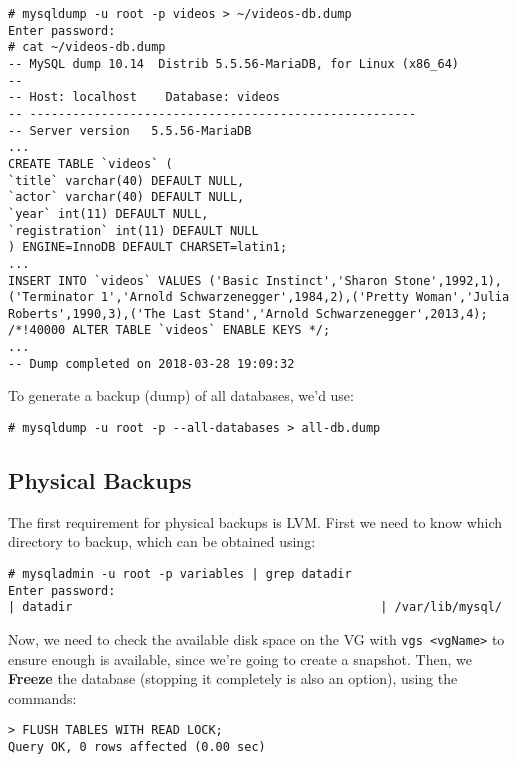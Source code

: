 \vspace{-15pt}
\begin{verbatim}
# mysqldump -u root -p videos > ~/videos-db.dump
Enter password: 
# cat ~/videos-db.dump 
-- MySQL dump 10.14  Distrib 5.5.56-MariaDB, for Linux (x86_64)
--
-- Host: localhost    Database: videos
-- ------------------------------------------------------
-- Server version	5.5.56-MariaDB
...
CREATE TABLE `videos` (
`title` varchar(40) DEFAULT NULL,
`actor` varchar(40) DEFAULT NULL,
`year` int(11) DEFAULT NULL,
`registration` int(11) DEFAULT NULL
) ENGINE=InnoDB DEFAULT CHARSET=latin1;
...
INSERT INTO `videos` VALUES ('Basic Instinct','Sharon Stone',1992,1),('Terminator 1','Arnold Schwarzenegger',1984,2),('Pretty Woman','Julia Roberts',1990,3),('The Last Stand','Arnold Schwarzenegger',2013,4);
/*!40000 ALTER TABLE `videos` ENABLE KEYS */;
...
-- Dump completed on 2018-03-28 19:09:32
\end{verbatim}
\vspace{-10pt}	

\noindent
To generate a backup (dump) of all databases, we'd use:

\vspace{-15pt}
\begin{verbatim}
# mysqldump -u root -p --all-databases > all-db.dump
\end{verbatim}
\vspace{-10pt}	

\subsection{Physical Backups}
The first requirement for physical backups is LVM. First we need to know which directory to backup, which can be obtained using:

\vspace{-15pt}
\begin{verbatim}
# mysqladmin -u root -p variables | grep datadir
Enter password: 
| datadir                                           | /var/lib/mysql/
\end{verbatim}
\vspace{-10pt}	

\noindent
Now, we need to check the available disk space on the VG with \verb|vgs <vgName>| to ensure enough is available, since we're going to create a snapshot. Then, we \textbf{Freeze} the database (stopping it completely is also an option), using the commands:

\vspace{-15pt}
\begin{verbatim}
> FLUSH TABLES WITH READ LOCK;
Query OK, 0 rows affected (0.00 sec)
\end{verbatim}
\vspace{-10pt}	

